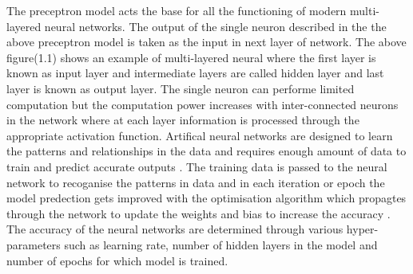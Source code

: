 The preceptron model acts the base for all the functioning of modern multi-layered neural networks.
The output of the single neuron described in the the above preceptron model is taken as the input in 
next layer of network. The above figure(1.1) shows an example of multi-layered neural where the first layer is known 
as input layer and intermediate layers are called hidden layer and last layer is known as output layer.
The single neuron can performe limited computation but the computation power increases with inter-connected
neurons in the network \citep*{AGATONOVICKUSTRIN2000717} where at each layer information is processed through the appropriate 
activation function. Artifical neural networks are designed to learn the patterns and relationships in the data  and 
requires enough amount of data to train and predict accurate outputs \citep*{AGATONOVICKUSTRIN2000717}.
The training data is passed to the neural network to recoganise the patterns in data and in each iteration or epoch 
the model predection gets improved with the optimisation algorithm which propagtes through the network to 
update the weights and bias to increase the accuracy \citep*{AGATONOVICKUSTRIN2000717}. The accuracy of the neural networks 
are determined through various hyper-parameters such as learning rate, number of hidden layers in the model and 
number of epochs for which model is trained. 


